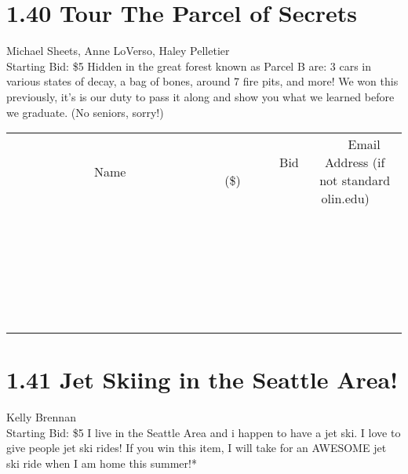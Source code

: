 \documentclass[11pt]{article}
\begin{document}
\section*{1.40 Tour The Parcel of Secrets}
Michael Sheets, Anne LoVerso, Haley Pelletier
\\
Starting Bid: \$5
\newline
Hidden in the great forest known as Parcel B are: 3 cars in various states of decay, a bag of bones, around 7 fire pits, and more! We won this previously, it's is our duty to pass it along and show you what we learned before we graduate. (No seniors, sorry!)
\\[6ex]
\begin{tabular}{c c c}
~~~~~~~~~~~~~Name~~~~~~~~~~~~~ & ~~~~~~~~~Bid (\$)~~~~~~~~~  & ~~~Email Address (if not standard olin.edu)~~~\\
 & & \\
\hline
 & & \\
\hline
 & & \\
\hline
 & & \\
\hline
 & & \\
\hline
 & & \\
\hline
 & & \\
\hline
 & & \\
\hline
 & & \\
\hline
 & & \\
\hline
 & & \\
\hline
 & & \\
\hline
 & & \\
\hline
 & & \\
\hline
 & & \\
\hline
 & & \\
\hline
 & & \\
\hline
 & & \\
\hline
 & & \\
\hline
 & & \\
\hline
 & & \\
\hline
 & & \\
\hline
 & & \\
\hline
 & & \\
\hline
 & & \\
\hline
 & & \\
\hline
\end{tabular}
\newpage
\section*{1.41 Jet Skiing in the Seattle Area!}
Kelly Brennan
\\
Starting Bid: \$5
\newline
I live in the Seattle Area and i happen to have a jet ski. I love to give people jet ski rides! If you win this item, I will take for an AWESOME jet ski ride when I am home this summer!* 
\end{document}
